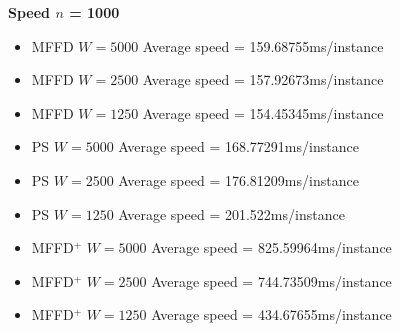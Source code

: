 \documentclass[oribibl]{llncs}
\begin{document}
\textbf{Speed $n$ = 1000}
\begin{itemize}
	\item MFFD $W = 5000$ Average speed = 159.68755ms/instance
	\item MFFD $W = 2500$ Average speed = 157.92673ms/instance
	\item MFFD $W = 1250$ Average speed = 154.45345ms/instance
	\item PS $W = 5000$ Average speed = 168.77291ms/instance
	\item PS $W = 2500$ Average speed = 176.81209ms/instance
	\item PS $W = 1250$ Average speed = 201.522ms/instance
	\item MFFD$^+$ $W = 5000$ Average speed = 825.59964ms/instance
	\item MFFD$^+$ $W = 2500$ Average speed = 744.73509ms/instance
	\item MFFD$^+$ $W = 1250$ Average speed = 434.67655ms/instance
\end{itemize}






\end{document}
